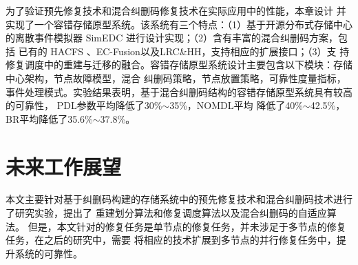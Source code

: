 为了验证预先修复技术和混合纠删码修复技术在实际应用中的性能，本章设计
并实现了一个容错存储原型系统。该系统有三个特点：（1）基于开源分布式存储中心
的离散事件模拟器 SimEDC 进行设计实现；（2）含有丰富的混合纠删码方案，包括
已有的 HACFS 、EC-Fusion以及LRC\&HH，支持相应的扩展接口；（3）支
持修复调度中的重建与迁移的融合。容错存储原型系统设计主要包含以下模块：存储中心架构，节点故障模型，混合
纠删码策略，节点放置策略，可靠性度量指标，事件处理模式。实验结果表明，基于混合纠删码结构的容错存储原型系统具有较高的可靠性，
PDL参数平均降低了30\%$\sim$35\%，NOMDL平均
降低了40\%$\sim$42.5\%，BR平均降低了35.6\%$\sim$37.8\%。


\section{未来工作展望}
本文主要针对基于纠删码构建的存储系统中的预先修复技术和混合纠删码技术进行了研究实验，提出了
重建划分算法和修复调度算法以及混合纠删码的自适应算法。
但是，本文针对的修复任务是单节点的修复任务，并未涉足于多节点的修复任务，在之后的研究中，需要
将相应的技术扩展到多节点的并行修复任务中，提升系统的可靠性。


% 
% 
% 
% 

